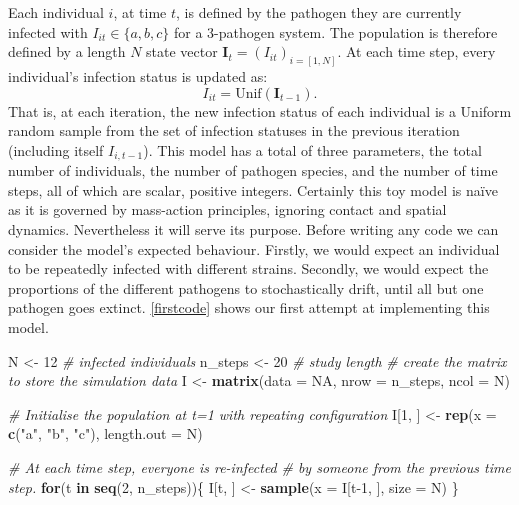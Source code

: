 \documentclass[
]{article}
\newenvironment{Shaded}{\begin{snugshade}}{\end{snugshade}}
\newcommand{\CommentTok}[1]{\textcolor[rgb]{0.56,0.35,0.01}{\textit{#1}}}
\newcommand{\ControlFlowTok}[1]{\textcolor[rgb]{0.13,0.29,0.53}{\textbf{#1}}}
\newcommand{\DataTypeTok}[1]{\textcolor[rgb]{0.13,0.29,0.53}{#1}}
\newcommand{\DecValTok}[1]{\textcolor[rgb]{0.00,0.00,0.81}{#1}}
\newcommand{\KeywordTok}[1]{\textcolor[rgb]{0.13,0.29,0.53}{\textbf{#1}}}
\newcommand{\NormalTok}[1]{#1}
\newcommand{\OtherTok}[1]{\textcolor[rgb]{0.56,0.35,0.01}{#1}}
\newcommand{\StringTok}[1]{\textcolor[rgb]{0.31,0.60,0.02}{#1}}
\begin{document}
Each individual \(i\), at time \(t\), is defined by the pathogen they are currently infected with \(I_{it} \in \{a, b, c\}\) for a 3-pathogen system.
The population is therefore defined by a length \(N\) state vector \(\mathbf{I}_t = (I_{it})_{i=[1,N]}\).
At each time step, every individual's infection status is updated as:
\[I_{it} = \text{Unif}(\mathbf{I}_{t-1}).\]
That is, at each iteration, the new infection status of each individual is a Uniform random sample from the set of infection statuses in the previous iteration (including itself \(I_{i,t-1}\)).
This model has a total of three parameters, the total number of individuals, the number of pathogen species, and the number of time steps, all of which are scalar, positive integers.
Certainly this toy model is naïve as it is governed by mass-action principles, ignoring contact and spatial dynamics.
Nevertheless it will serve its purpose.
Before writing any code we can consider the model's expected behaviour.
Firstly, we would expect an individual to be repeatedly infected with different strains.
Secondly, we would expect the proportions of the different pathogens to stochastically drift, until all but one pathogen goes extinct.
\ref{firstcode} shows our first attempt at implementing this model.
\newline
{}\label{firstcode}

\begin{Shaded}
\begin{Highlighting}[]
\NormalTok{N <-}\StringTok{ }\DecValTok{12} \CommentTok{# infected individuals}
\NormalTok{n_steps <-}\StringTok{ }\DecValTok{20} \CommentTok{# study length}
\CommentTok{# create the matrix to store the simulation data}
\NormalTok{I <-}\StringTok{ }\KeywordTok{matrix}\NormalTok{(}\DataTypeTok{data =} \OtherTok{NA}\NormalTok{, }\DataTypeTok{nrow =}\NormalTok{ n_steps, }\DataTypeTok{ncol =}\NormalTok{ N)}

\CommentTok{# Initialise the population at t=1 with repeating configuration}
\NormalTok{I[}\DecValTok{1}\NormalTok{, ] <-}\StringTok{ }\KeywordTok{rep}\NormalTok{(}\DataTypeTok{x =} \KeywordTok{c}\NormalTok{(}\StringTok{"a"}\NormalTok{, }\StringTok{"b"}\NormalTok{, }\StringTok{"c"}\NormalTok{), }\DataTypeTok{length.out =}\NormalTok{ N)}

\CommentTok{# At each time step, everyone is re-infected }
\CommentTok{# by someone from the previous time step.}
\ControlFlowTok{for}\NormalTok{(t }\ControlFlowTok{in} \KeywordTok{seq}\NormalTok{(}\DecValTok{2}\NormalTok{, n_steps))\{}
\NormalTok{  I[t, ] <-}\StringTok{ }\KeywordTok{sample}\NormalTok{(}\DataTypeTok{x =}\NormalTok{ I[t}\DecValTok{-1}\NormalTok{, ], }\DataTypeTok{size =}\NormalTok{ N)}
\NormalTok{\}}
\end{Highlighting}
\end{Shaded}
\end{document}
